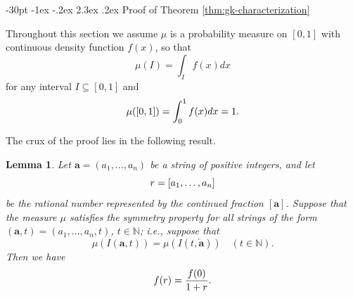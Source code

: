 \documentclass[10pt]{article}
\makeatletter
\renewcommand\section{\@startsection {section}{1}{\z@}
{-30pt \@plus -1ex \@minus -.2ex}
{2.3ex \@plus.2ex}
{\normalfont\normalsize\bfseries\boldmath}}
\newtheorem{lemma}{Lemma}
\theoremstyle{definition}
\numberwithin{equation}{section}
\numberwithin{lemma}{section}
\newcommand{\NN}{\mathbb{N}}
\newcommand{\bfa}{\mathbf{a}}
\newcommand{\bfar}{\overleftarrow{\bfa}}
\makeatother
\begin{document}

\section{Proof of Theorem \protect \ref{thm:gk-characterization}} 
\label{sec:thm1}


Throughout this section
we assume $\mu$ is a probability measure on $[0,1]$ with continuous
density function $f(x)$, so that
\begin{equation}
\label{eq:proof1.1-mu-def}
\mu(I)=\int_I f(x)dx
\end{equation}
for any interval $I\subseteq [0,1]$ and 
\begin{equation}
\notag
\mu([0,1])=\int_0^1f(x)dx=1.
\end{equation}

The crux of the proof lies in the following result.

\begin{lemma}
\label{lem:proof1.1-lemma1}
Let $\bfa=(a_1,\dots,a_n)$ be a string of positive integers,  and let
\begin{equation}
\notag
r=[a_1,\dots,a_n]
\end{equation}
be the rational number represented by the continued fraction $[\bfa]$.
Suppose that the measure
$\mu$ satisfies the symmetry property for all strings of the form
$(\bfa,t)=(a_1,\dots,a_n,t)$, $t\in\NN$; i.e., suppose that
\begin{equation}
\label{eq:proof1.1-symmetry1}
\mu(I(\bfa,t))=\mu(I(t,\bfar))\quad (t\in\NN).
\end{equation}
Then we have
\begin{equation}
\notag
f(r)=\frac{f(0)}{1+r}.
\end{equation}
\end{lemma}
\end{document}
